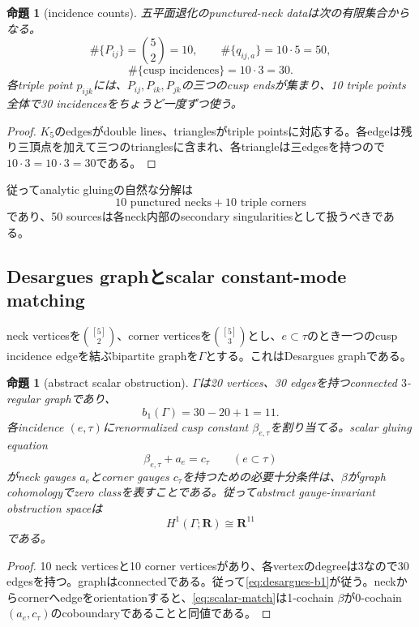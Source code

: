 \documentclass[11pt,a4paper]{ltjsarticle}
\newtheorem{proposition}[theorem]{命題}
\theoremstyle{definition}
\theoremstyle{remark}
\newcommand{\RR}{\mathbf R}
\begin{document}
\begin{proposition}[incidence counts]\label{prop:ten-neck-incidence}
五平面退化のpunctured-neck dataは次の有限集合からなる。
\[
 \#\{P_{ij}\}=\binom52=10,
 \qquad
 \#\{q_{ij,a}\}=10\cdot5=50,
\]
\[
 \#\{\text{cusp incidences}\}=10\cdot3=30.
\]
各triple point $p_{ijk}$には、$P_{ij},P_{ik},P_{jk}$の三つのcusp endsが集まり、10 triple points全体で30 incidencesをちょうど一度ずつ使う。
\end{proposition}

\begin{proof}
$K_5$のedgesがdouble lines、trianglesがtriple pointsに対応する。各edgeは残り三頂点を加えて三つのtrianglesに含まれ、各triangleは三edgesを持つので
$10\cdot3=10\cdot3=30$である。
\end{proof}

従ってanalytic gluingの自然な分解は
\[
 \boxed{10\text{ punctured necks}+10\text{ triple corners}}
\]
であり、50 sourcesは各neck内部のsecondary singularitiesとして扱うべきである。

\subsection{Desargues graphとscalar constant-mode matching}
\label{subsec:desargues-matching}

neck verticesを$\binom{[5]}2$、corner verticesを$\binom{[5]}3$とし、$e\subset\tau$のとき一つのcusp incidence edgeを結ぶbipartite graphを$\Gamma$とする。これはDesargues graphである。

\begin{proposition}[abstract scalar obstruction]\label{prop:desargues-obstruction}
$\Gamma$は20 vertices、30 edgesを持つconnected $3$-regular graphであり、
\begin{equation}\label{eq:desargues-b1}
 b_1(\Gamma)=30-20+1=11.
\end{equation}
各incidence $(e,\tau)$にrenormalized cusp constant $\beta_{e,\tau}$を割り当てる。scalar gluing equation
\begin{equation}\label{eq:scalar-match}
 \beta_{e,\tau}+a_e=c_\tau
 \qquad(e\subset\tau)
\end{equation}
がneck gauges $a_e$とcorner gauges $c_\tau$を持つための必要十分条件は、$\beta$がgraph cohomologyでzero classを表すことである。従ってabstract gauge-invariant obstruction spaceは
\[
 H^1(\Gamma;\RR)\cong\RR^{11}
\]
である。
\end{proposition}

\begin{proof}
10 neck verticesと10 corner verticesがあり、各vertexのdegreeは3なので30 edgesを持つ。graphはconnectedである。従って\eqref{eq:desargues-b1}が従う。neckからcornerへedgeをorientationすると、\eqref{eq:scalar-match}は1-cochain $\beta$が0-cochain $(a_e,c_\tau)$のcoboundaryであることと同値である。
\end{proof}
\end{document}
